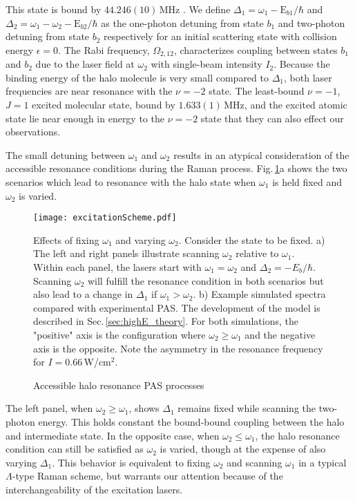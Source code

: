 This state is bound by $44.246(10)$\,MHz \cite{Borkowski2014a, Reschovsky2018}.
We define $\Delta_1=\omega_1-\text{E}_{b1}/\hbar$ and $\Delta_2=\omega_1-\omega_2-\text{E}_{b2}/\hbar$ as the one-photon detuning from state $b_1$ and two-photon detuning from state $b_2$ respectively for an initial scattering state with collision energy $\epsilon=0$.
The Rabi frequency, $\Omega_{2,12}$, characterizes coupling between states $b_1$ and $b_2$ due to the laser field at $\omega_2$ with single-beam intensity $I_2$.
Because the binding energy of the halo molecule is very small compared to $\Delta_1$, both laser frequencies are near resonance with the $\nu=-2$ state. 
The least-bound $\nu=-1$, $J=1$ excited molecular state, bound by $1.633(1)$\,MHz, and the excited atomic state lie near enough in energy to the $\nu = -2$ state that they can also effect our observations.	

The small detuning between $\omega_1$ and $\omega_2$ results in an atypical consideration of the accessible resonance conditions during the Raman process.
Fig.\,\ref{fig:haloResProcess}a shows the two scenarios which lead to resonance with the halo state when $\omega_1$ is held fixed and $\omega_2$ is varied.
	\begin{figure} 
	\centerline{
	  \texttt{[image: excitationScheme.pdf]}}
	  \caption{Accessible halo resonance PAS processes}{Effects of fixing $\omega_1$ and varying $\omega_2$. Consider the state  to be fixed. a) The left and right panels illustrate scanning $\omega_2$ relative to $\omega_1$. Within each panel, the lasers start with $\omega_1 = \omega_2$ and $\Delta_2 = -E_b/\hbar$. Scanning $\omega_2$ will fulfill the resonance condition in both scenarios but also lead to a change in $\Delta_1$ if $\omega_1 > \omega_2$.  b) Example simulated spectra compared with experimental PAS. The development of the model is described in Sec.\,\ref{sec:highE_theory}. For both simulations, the "positive" axis is the configuration where $\omega_2 \geq \omega_1$ and the negative axis is the opposite. Note the asymmetry in the resonance frequency for $I=0.66$\,W/cm$^2$.}
	  \label{fig:haloResProcess}
	\end{figure}
The left panel, when $\omega_2 \geq \omega_1$, shows $\Delta_1$ remains fixed while scanning the two-photon energy.
This holds constant the bound-bound coupling between the halo and intermediate state.
In the opposite case, when $\omega_2 \leq \omega_1$, the halo resonance condition can still be satisfied as $\omega_2$ is varied, though at the expense of also varying $\Delta_1$.
This behavior is equivalent to fixing $\omega_2$ and scanning $\omega_1$ in a typical $\Lambda$-type Raman scheme, but warrants our attention because of the interchangeability of the excitation lasers.


